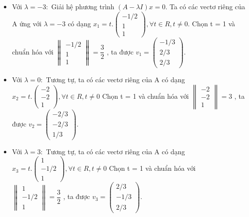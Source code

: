 \documentclass{article}
\begin{document}
\begin{itemize}
    \item Với \( \lambda = -3: \)
          \newline Giải hệ phương trình \( (A - \lambda I)x = 0 \).
          Ta có các vectơ riêng của A ứng với \( \lambda = -3\) có dạng
          \( x_1 = t.\begin{pmatrix} -1/2 \\ 1 \\ 1 \end{pmatrix}
          ,\forall t \in R, t \neq 0 \).
          \newline Chọn t = 1 và chuẩn hóa với \( \begin{Vmatrix} -1/2 \\ 1 \\ 1 \end{Vmatrix}
          = \dfrac{3}{2} \) , ta được
          \(v_1 = \begin{pmatrix} -1/3 \\ 2/3 \\ 2/3 \end{pmatrix}\).
    \item Với \( \lambda = 0: \)
          \newline Tương tự, ta có các vectơ riêng của A có dạng
          \( x_2 = t.\begin{pmatrix}
              -2 \\ -2 \\ 1
          \end{pmatrix} ,\forall t \in R, t \neq 0 \)
          \newline Chọn t = 1 và chuẩn hóa với \( \begin{Vmatrix} -2 \\ -2 \\ 1 \end{Vmatrix}
          = 3 \) , ta được
          \(v_2 = \begin{pmatrix} -2/3 \\ -2/3 \\ 1/3 \end{pmatrix}\).
    \item Với \( \lambda = 3: \)
          \newline Tương tự, ta có các vectơ riêng của A có dạng
          \( x_3 = t.\begin{pmatrix}
              1 \\ -1/2 \\ 1
          \end{pmatrix} ,\forall t \in R, t \neq 0 \)
          \newline Chọn t = 1 và chuẩn hóa với \( \begin{Vmatrix} 1 \\ -1/2 \\ 1 \end{Vmatrix}
          = \dfrac{3}{2} \) , ta được
          \(v_3 = \begin{pmatrix} 2/3 \\ -1/3 \\ 2/3 \end{pmatrix}\).
\end{itemize}
\end{document}
